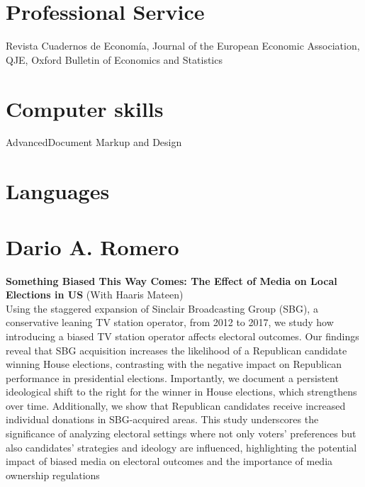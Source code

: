 \documentclass{moderncv}
\begin{document}
\section{\textbf{Professional Service}}
{Revista Cuadernos de Econom\'ia, Journal of the European Economic Association, QJE, Oxford Bulletin of Economics and Statistics\\ }


\section{\textbf{Computer skills}}
 {Advanced}{Document Markup and Design}

\section{\textbf{Languages}}

\pagebreak 
\section{\textbf{Dario A. Romero}}
{\textbf{Something Biased This Way Comes: The Effect of Media on Local Elections in US} (With Haaris Mateen) \\ }
{Using the staggered expansion of Sinclair Broadcasting Group (SBG), a conservative leaning TV station operator, from 2012 to 2017, we study how introducing a biased TV station operator affects electoral outcomes. Our findings reveal that SBG acquisition increases the likelihood of a Republican candidate winning House elections, contrasting with the negative impact on Republican performance in presidential elections. Importantly, we document a persistent ideological shift to the right for the winner in House elections, which strengthens over time. Additionally, we show that Republican candidates receive increased individual donations in SBG-acquired areas. This study underscores the significance of analyzing electoral settings where not only voters' preferences but also candidates' strategies and ideology are influenced, highlighting the potential impact of biased media on electoral outcomes and the importance of media ownership regulations\\} \vspace*{0.25cm}
\end{document}
